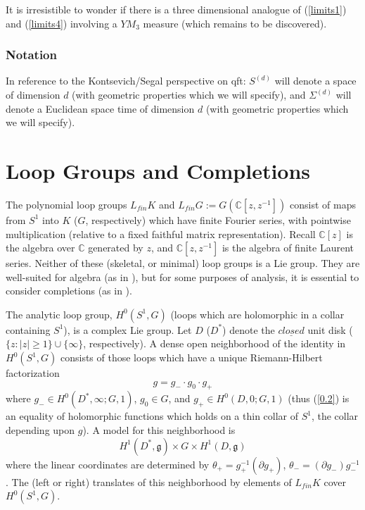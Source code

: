 \documentclass{amsart}
\theoremstyle{conjecture}
\theoremstyle{definition}
\theoremstyle{question}
\theoremstyle{questions}
\theoremstyle{remark}
\theoremstyle{remarks}
\theoremstyle{example}
\numberwithin{equation}{section}
\begin{document}
It is irresistible to wonder if there is a three dimensional analogue of (\ref{limits1}) and (\ref{limits4}) involving a $YM_3$ measure (which remains to be discovered).  

\subsubsection{Notation} In reference to the Kontsevich/Segal perspective on qft: $S^{(d)}$ will denote a space of dimension $d$ (with geometric properties which we will specify), and $\Sigma^{(d)}$ will denote a Euclidean space time of dimension $d$ (with geometric properties which we will specify).


\section{Loop Groups and Completions}\label{background}


The polynomial loop groups $L_{fin}K$ and $L_{fin}G:=G(\mathbb
C[z,z^{-1}])$ consist of maps from $S^1$ into $K$ ($G$,
respectively) which have finite Fourier series, with pointwise
multiplication (relative to a fixed faithful matrix representation).
Recall $\mathbb C[z]$ is the algebra over $\mathbb
C$ generated by $z$, and $\mathbb C[z,z^{-1}]$ is the algebra of
finite Laurent series. Neither of these (skeletal, or minimal) loop groups is
a Lie group. They are well-suited for algebra (as in \cite{KP}), but for some purposes of analysis, it is essential
to consider completions (as in \cite{PS}).

The analytic loop group, $H^0(S^1,G)$ (loops which are holomorphic in a collar containing $S^1$),
is a complex Lie
group. Let $D$ ($D^*$) denote the $\underline{closed}$ unit disk
($\{z:|z|\ge 1\}\cup\{\infty\}$, respectively).
A dense open neighborhood of the identity in $H^0(S^1,G)$ consists of those loops
which have a unique Riemann-Hilbert factorization
\begin{equation}\label{0.2}g=g_{-}\cdot g_0\cdot g_{+}\end{equation}
where $g_{-}\in H^0(D^{*},\infty ;G,1)$, $g_0\in G$, and $g_{+}\in
H^ 0(D,0;G,1)$ (thus (\ref{0.2}) is an equality of holomorphic
functions which holds on a thin collar of $S^1$, the collar
depending upon $g$). A model for this neighborhood is
$$H^1(D^{*},\mathfrak g)\times G\times H^1(D,\mathfrak g)$$
where the linear coordinates are determined by
$\theta_{+}=g_{+}^{-1}(\partial g_{+})$, $\theta_{-}=(\partial g_{
-})g_{-}^{-1}$.  The (left or right) translates of this
neighborhood by elements of $L_{fin}K$ cover
$H^0(S^1,G)$.
\end{document}
